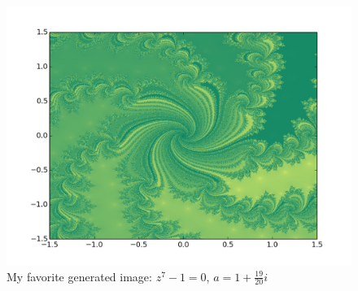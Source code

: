 \documentclass[12pt]{article}
\begin{document}
\begin{figure}[H]
    \centerline{
        \includegraphics[scale=1]{fractal_500_2500_7.png}
    }
    \caption*{My favorite generated image: $z^7 - 1 = 0$, $a = 1 + \frac{19}{20}i$}
\end{figure}
\end{document}
